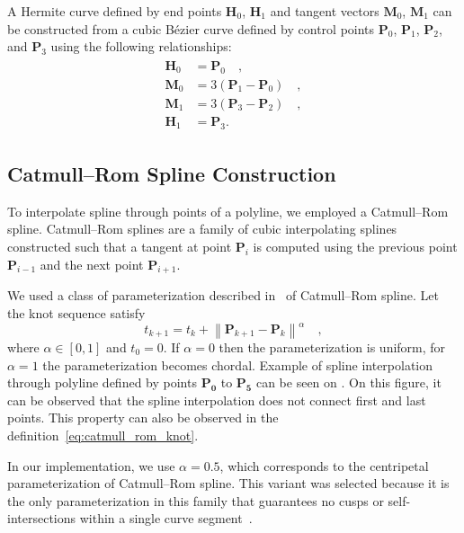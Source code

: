 A Hermite curve defined by end points $\mathbf{H}_0$, $\mathbf{H}_1$ and tangent vectors $\mathbf{M}_0$, $\mathbf{M}_1$ can be constructed from a cubic B\'ezier curve defined by control points $\mathbf{P}_0$, $\mathbf{P}_1$, $\mathbf{P}_2$, and $\mathbf{P}_3$ using the following relationships:
\begin{align}
	\begin{aligned}
		\mathbf{H}_0 &= \mathbf{P}_0\quad, \\
		\mathbf{M}_0 &= 3\left(\mathbf{P}_1 - \mathbf{P}_0\right)\quad, \\
		\mathbf{M}_1 &= 3\left(\mathbf{P}_3 - \mathbf{P}_2\right)\quad, \\
		\mathbf{H}_1 &= \mathbf{P}_3.
	\end{aligned}
\end{align}

\subsection{Catmull--Rom Spline Construction}

To interpolate spline through points of a polyline, we employed a Catmull--Rom spline. Catmull--Rom splines are a family of cubic interpolating splines constructed such that a tangent at point $\mathbf{P}_i$ is computed using the previous point $\mathbf{P}_{i-1}$ and the next point $\mathbf{P}_{i+1}$.

We used a class of parameterization described in~\cite{bk_catmull_rom_parameterization} of Catmull--Rom spline. Let the knot sequence satisfy
\begin{equation}
	t_{k+1} = t_k + \left\lVert \mathbf{P}_{k+1} - \mathbf{P}_k \right\rVert^\alpha\quad,
	\label{eq:catmull_rom_knot}
\end{equation}
where $\alpha \in [0,1]$ and $t_{0} = 0$. If $\alpha = 0$ then the parameterization is uniform, for $\alpha = 1$ the parameterization becomes chordal. Example of spline interpolation through polyline defined by points $\mathbf{P_0}$ to $\mathbf{P_5}$ can be seen on . On this figure, it can be observed that the spline interpolation does not connect first and last points. This property can also be observed in the definition~\ref{eq:catmull_rom_knot}.

In our implementation, we use $\alpha = 0.5$, which corresponds to the centripetal parameterization of Catmull--Rom spline. This variant was selected because it is the only parameterization in this family that guarantees no cusps or self-intersections within a single curve segment~\cite{bk_catmull_rom_bezier}.

